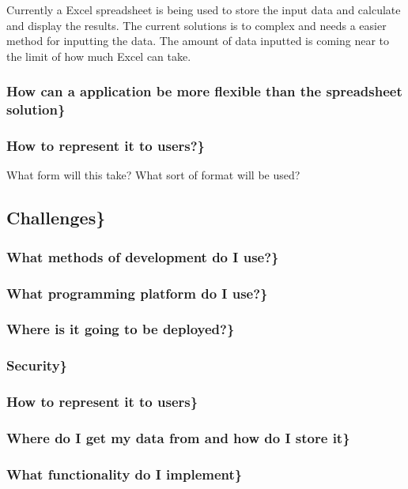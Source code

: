 \documentclass[11pt]{article}
\begin{document}
Currently a Excel spreadsheet is being used to store the input data
and calculate and display the results.  The current solutions is to
complex and needs a easier method for inputting the data.  The amount
of data inputted is coming near to the limit of how much Excel can
take.
\subsubsection{How can a application be more flexible than the spreadsheet solution\}}
\label{sec-2_1_2}
\subsubsection{How to represent it to users?\}}
\label{sec-2_1_3}

What form will this take?  What sort of format will be used?
\subsection{Challenges\}}
\label{sec-2_2}
\subsubsection{What methods of development do I use?\}}
\label{sec-2_2_1}
\subsubsection{What programming platform do I use?\}}
\label{sec-2_2_2}
\subsubsection{Where is it going to be deployed?\}}
\label{sec-2_2_3}
\subsubsection{Security\}}
\label{sec-2_2_4}
\subsubsection{How to represent it to users\}}
\label{sec-2_2_5}
\subsubsection{Where do I get my data from and how do I store it\}}
\label{sec-2_2_6}
\subsubsection{What functionality do I implement\}}
\label{sec-2_2_7}
\end{document}
